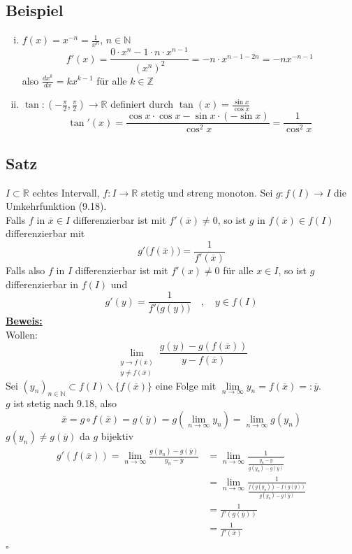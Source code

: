 \subsection{Beispiel} %
\label{sub:beispiel}
\begin{enumerate}[(i)]
	\item $f(x)=x^{-n}= \frac{1}{x^n} $, $n \in \mathds{N}$
	\[
		f'(x)= \frac{0 \cdot x^n- 1 \cdot n \cdot x^{n-1}}{(x^n)^2} = -n \cdot x^{n-1-2n} = -n x^{-n-1} 
	\]
	also $\frac{dx^k}{dx} =k x^{k-1} $ für alle $k \in \mathds{Z}$
	\item $\tan : (- \frac{\pi}{2}, \frac{\pi}{2}) \to \mathds{R}$ definiert durch $\tan(x)= \frac{\sin x}{\cos x} $
	\[
		\tan' (x) = \frac{\cos x \cdot \cos x - \sin x \cdot (- \sin x)}{\cos^2 x} = \frac{1}{\cos^2 x} 
	\]
\end{enumerate}

\subsection{Satz} %
\label{sub:satz}
$I \subset \mathds{R}$ echtes Intervall, $f : I \to \mathds{R}$ stetig und streng monoton. Sei $g : f(I) \to I$ die Umkehrfunktion (9.18). \\
Falls $f$  in $\overline{x} \in I$ differenzierbar ist mit $f'(\overline{x}) \not= 0$, so ist $g$ in $f(\overline{x}) \in f(I)$ differenzierbar mit 
\[
	g'\big( f(\overline{x}) \big) = \frac{1}{f'(\overline{x})}
\]
Falls also $f$ in $I$ differenzierbar ist mit $f'(x) \not= 0$ für alle $x \in I$, so ist $g$ differenzierbar in $f(I)$ und 
\[
	g'(y) = \frac{1}{f'\big( g(y) \big)} \quad , \quad y \in f(I) 
\]
\underline{\textbf{Beweis:}} \\
Wollen: 
\[
	\lim\limits_{\substack{y \to f(\overline{x}) \\ y \not= f(\overline{x})}} \frac{g(y)- g(f(\overline{x}))}{y-f(\overline{x})}  
\]
Sei $(y_n)_{n \in \mathds{N}} \subset f(I) \backslash \{ f(\overline{x}) \}$ eine Folge mit $\lim\limits_{n \to \infty} y_n= f(\overline{x})=: \overline{y}$. \\
$g$ ist stetig nach 9.18, also
\[
	\overline{x} = g \circ f (\overline{x})= g(\overline{y}) = g \left( \lim\limits_{n \to \infty} y_n\right) = \lim\limits_{n \to \infty} g( y_n)
\] $g(y_n) \not= g(\overline{y})$ da $g$ bijektiv
\begin{align*}
	g'(f(\overline{x})) = \lim\limits_{n \to \infty} \frac{g(y_n) -g(\overline{y})}{y_n -\overline{y}} &= 
	\lim\limits_{n \to \infty} \frac{1}{\frac{y_n - \overline{y}}{g(y_n)- g(\overline{y})}} \\
	&= \lim\limits_{n \to \infty} \frac{1}{\frac{f(g(y_n)) - f(g(\overline{y}))}{g(y_n)- g(\overline{y})} } \\
	&= \frac{1}{f'(g(\overline{y}))} \\
	&= \frac{1}{f'(\overline{x})}     
\end{align*}
\hfill \( \square \)

